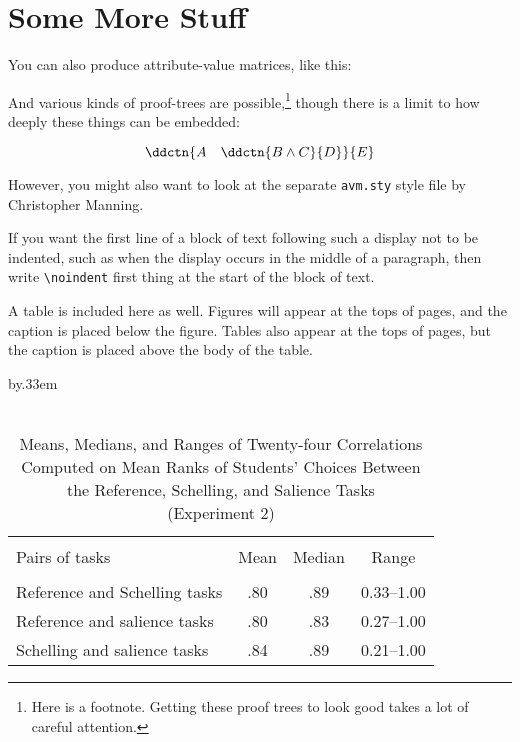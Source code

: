 \section{Some More Stuff}


You can also produce attribute-value
matrices, like this:
 \begin{center}
 \end{center}
And various kinds of proof-trees are
possible,\footnote{Here is a footnote.  Getting these proof trees to
look good takes a lot of careful attention.} though
there is a limit to how deeply these things can be embedded:

 \[
 \ddctn{A\quad \ddctn{B \land C}{D}}{E}
 \]

However, you might also want to look at the separate \texttt{avm.sty} style
file by Christopher Manning.

If you want the first line of a block of
text following such a display not to be indented, such as when the
display occurs in the middle of a paragraph, then write
\texttt{\backslash noindent} first thing at the start of the block of text.

A table is included here as well.  Figures will appear at the tops of
pages, and the caption is placed below the figure.  Tables also appear
at the tops of pages, but the caption is placed above the body of the
table.

 \begin{table}[t]
 \caption[Means, Medians, and Ranges (Experiment 2)]{ \\
 Means, Medians, and Ranges of Twenty-four Correlations \\
 Computed on Mean Ranks of Students' Choices Between \\
 the Reference, Schelling, and Salience Tasks \\
 \scriptsize (Experiment 2)}\label{mmr}
 \begin{center}
 {\footnotesize\advance\tabcolsep by.33em
 \begin{tabular}{lccc}\hline\\[-2ex]
 \sc Pairs of tasks& \sc Mean& \sc Median& \sc Range\\[.5ex]
 \hline \\[-2ex]
 Reference and Schelling tasks& .80& .89& 0.33--1.00\\
 Reference and salience tasks& .80& .83& 0.27--1.00\\
 Schelling and salience tasks& .84& .89& 0.21--1.00\\[.5ex]
 \hline
 \end{tabular}}
 \end{center}
 \end{table}


